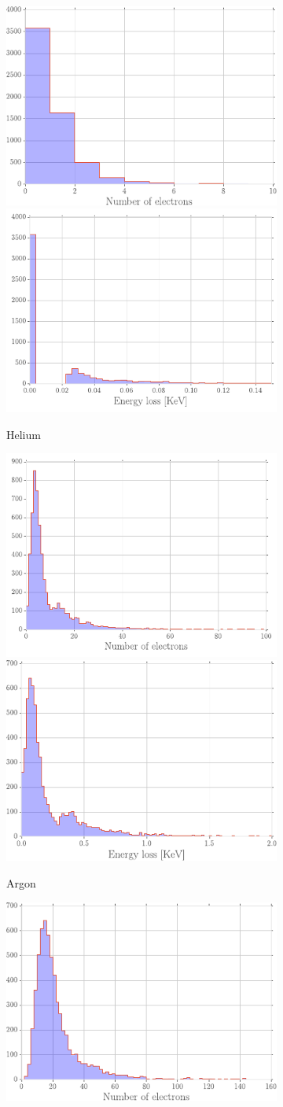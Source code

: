 	\begin{figure}[H]
		\begin{subfigure}{\linewidth}
			\centering
			\includegraphics[width = 0.43\linewidth]{fig/chapt3/N_elec_Helium.pdf}
			\includegraphics[width = 0.43\linewidth]{fig/chapt3/E_loss_Helium.pdf}
			\caption{\label{fig:Primary:A} Helium}
		\end{subfigure}
		\begin{subfigure}{\linewidth}
			\centering
			\includegraphics[width = 0.43\linewidth]{fig/chapt3/N_elec_Argon.pdf}
			\includegraphics[width = 0.43\linewidth]{fig/chapt3/E_loss_Argon.pdf}
			\caption{\label{fig:Primary:B} Argon}
		\end{subfigure}
		\begin{subfigure}{\linewidth}
			\centering
			\includegraphics[width = 0.43\linewidth]{fig/chapt3/N_elec_RPC.pdf}

\end{subfigure}
\end{figure}
